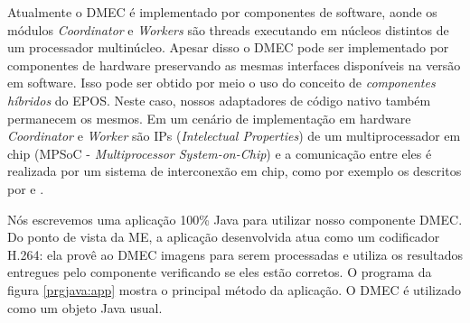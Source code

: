 Atualmente o DMEC é implementado por componentes de software, aonde os módulos
\emph{Coordinator} e \emph{Workers} são threads executando em núcleos distintos
de um processador multinúcleo.
Apesar disso o DMEC pode ser implementado por componentes de hardware 
preservando as mesmas interfaces disponíveis na versão em software.
Isso pode ser obtido por meio o uso do conceito de \emph{componentes híbridos}
do EPOS. 
Neste caso, nossos adaptadores de código nativo também permanecem os mesmos.
Em um cenário de implementação em hardware \emph{Coordinator} e \emph{Worker}
são IPs (\emph{Intelectual Properties}) de um multiprocessador em chip
(MPSoC - \emph{Multiprocessor System-on-Chip}) e a comunicação entre eles é realizada
por um sistema de interconexão em chip, como por exemplo os descritos por 
\cite{Javaid:2010:OSL:1878961.1878978} e \cite{Popovici:2009:FAC:1509633.1509681}.

Nós escrevemos uma aplicação 100\% Java para utilizar nosso componente DMEC.
Do ponto de vista da ME, a aplicação desenvolvida atua como um codificador
H.264: ela provê ao DMEC imagens para serem processadas e utiliza os resultados
entregues pelo componente verificando se eles estão corretos.
O programa da figura \ref{prgjava:app} mostra o principal método da aplicação.
O DMEC é utilizado como um objeto Java usual.


% 
% 
%


